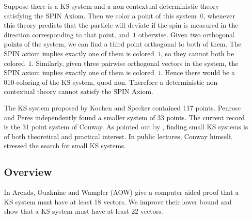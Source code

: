 \documentclass[adraft,copyright,creativecommons]{eptcs}
\theoremstyle{definition}
\theoremstyle{remark}
\begin{document}
{}

Suppose there is a KS system and a non-contextual deterministic theory satisfying
the SPIN Axiom.
Then we color a point of this system~$0$,
whenever this theory predicts that the particle will deviate
if the spin is measured in the direction corresponding to that
point, and~$1$ otherwise.
Given two orthogonal points of the system,
we can find a third point orthogonal to both of them.
The SPIN axiom implies exactly one of them is colored~$1$, so they
cannot both be colored~$1$.
Similarly, given three pairwise orthogonal vectors in the system,
the SPIN axiom implies exactly one of them is colored~$1$.
Hence there would be a 010-coloring of the KS system, quod non.
Therefore a deterministic non-contextual theory cannot satisfy the
SPIN Axiom.

The KS system proposed by Kochen and Specker contained 117 points\cite{ks}.
Penrose and Peres\cite{peres} independently found a smaller system of 33 points.
The current record is the 31 point system of Conway\cite[p.~197]{qtcm}.
As pointed out by \cite{c00,aow11}, finding small KS systems
is of both theoretical and practical interest.
In public lectures, Conway himself, stressed the search for small KS
systems.\cite{OC}

\subsection{Overview}
In \cite{aow11} Arends, Ouaknine and Wampler (AOW) give a computer aided proof
that a KS system must have at least 18 vectors.  We improve their lower bound
and show that a KS system must have at least 22 vectors.
\end{document}
